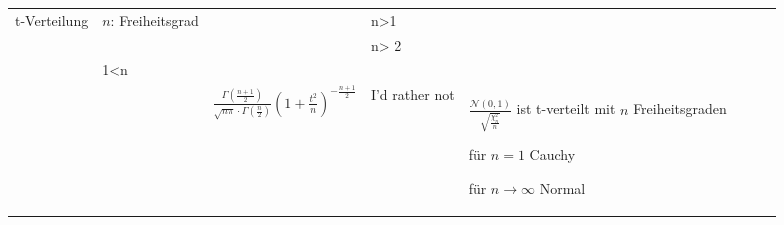 \documentclass[a4paper,10pt]{article}
\begin{document}
\begin{center}
\begin{tabularx}{\textwidth}{llXXXXXX}
		t-Verteilung             & \( n \): Freiheitsgrad         & \( \begin{cases} 0 & n>1 \\ \text{undef.} & \text{sonst} \end{cases} \) & \( \begin{cases} \frac{n}{n-2} & n> 2 \\ \infty & 1<n \leq 2 \\ \text{undef.} & \text{sonst} \end{cases} \) & \( \frac{\Gamma \left( \frac{n+1}{2} \right) }{\sqrt{n\pi } \cdot \Gamma (\frac{n}{2})} \left( 1+ \frac{t^2}{n} \right) ^{- \frac{n+1}{2}} \) & I'd rather not                                                                         & \begin{rowlist}
			                                                                                                                                                                                                                                                                                                                                                                                                                                                                                             \item $\frac{\mathcal{N}(0,1)}{\sqrt{\frac{\chi_n^2}{n}}}$ ist t-verteilt mit $n$ Freiheitsgraden
			                                                                                                                                                                                                                                                                                                                                                                                                                                                                                             \item für $n = 1$ Cauchy
			                                                                                                                                                                                                                                                                                                                                                                                                                                                                                             \item für $n \to \infty$ Normal
		                                                                                                                                                                                                                                                                                                                                                                                                                                                                                             \end{rowlist}                                                  \\


\end{tabularx}
\end{center}
\end{document}
